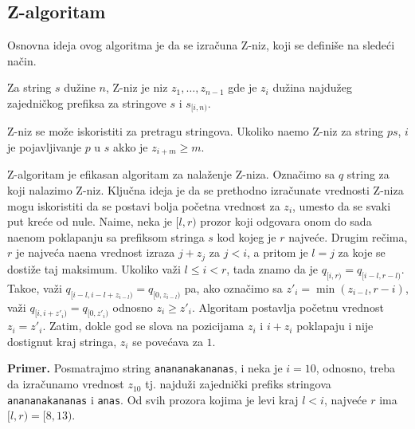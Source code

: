 \noindent
\begin{minipage}[l]{\textwidth}

\end{minipage}

\subsection{Z-algoritam}

Osnovna ideja ovog algoritma je da se izra\v cuna Z-niz, koji se defini\v se na slede\' ci na\v cin.

\begin{dfn}
Za string $s$ du\v zine $n$, Z-niz je niz $z_1, \ldots, z_{n-1}$ gde je $z_i$ du\v zina najdu\v zeg zajedni\v ckog prefiksa za stringove $s$ i $s_{[i, n)}$.
\end{dfn}

Z-niz se mo\v ze iskoristiti za pretragu stringova. Ukoliko na\dj emo Z-niz za string $ps$, $i$ je pojavljivanje $p$ u $s$ akko je $z_{i+m} \geq m$.

Z-algoritam je efikasan algoritam za nala\v zenje Z-niza.\cite{zalgoknjiga} Ozna\v cimo sa $q$ string za koji nalazimo Z-niz. Klju\v cna ideja je da se prethodno izra\v cunate vrednosti Z-niza mogu iskoristiti da se postavi bolja po\v cetna vrednost za $z_i$, umesto da se svaki put kre\' ce od nule. Naime, neka je $[l,r)$ prozor koji odgovara onom do sada na\dj enom poklapanju sa prefiksom stringa $s$ kod kojeg je $r$ najve\' ce. Drugim re\v cima, $r$ je najve\' ca na\dj ena vrednost izraza $j+z_j$ za $j<i$, a pritom je $l = j$ za koje se dosti\v ze taj maksimum. Ukoliko va\v zi $l \leq i < r$, tada znamo da je $q_{[i, r)} = q_{[i-l, r-l)}$. Tako\dj e, va\v zi $q_{[i-l, i-l+z_{i-l})} = q_{[0, z_{i-l})}$ pa, ako ozna\v cimo sa $z'_i = \min(z_{i-l}, r-i)$, va\v zi $q_{[i, i+z'_i)} = q_{[0, z'_i)}$ odnosno $z_i \geq z'_i$. Algoritam postavlja po\v cetnu vrednost $z_i = z'_i$. Zatim, dokle god se slova na pozicijama $z_i$ i $i + z_i$ poklapaju i nije dostignut kraj stringa, $z_i$ se pove\' cava za $1$.

\noindent
\begin{minipage}[l]{\textwidth}

\end{minipage}

\noindent \textbf{Primer.} Posmatrajmo string \texttt{anananakananas}, i neka je $i=10$, odnosno, treba da izra\v cunamo vrednost $z_{10}$ tj. najdu\v zi zajedni\v cki prefiks stringova \texttt{anananakananas} i \texttt{anas}. Od svih prozora kojima je levi kraj $l < i$, najve\' ce $r$ ima $[l,r) = [8,13)$.

